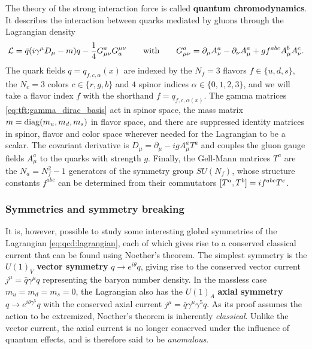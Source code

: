 The theory of the strong interaction force is called \textbf{quantum chromodynamics}.
It describes the interaction between quarks mediated by gluons through the Lagrangian density
\begin{equation}
	\mathcal{L} = \bar{q} ( i \gamma^\mu D_\mu - m ) q - \frac14 G_{\mu\nu}^a G^{\mu\nu}_a
	\qquad \text{with} \qquad
	G_{\mu\nu}^a = \partial_\mu A_\nu^a - \partial_\nu A_\mu^a + g f^{abc} A_\mu^b A_\nu^c.
\label{eq:qcd:lagrangian}
\end{equation}
The quark fields $q = q_{f,c,\alpha}(x)$ are indexed by
the $N_f = 3$ flavors $f \in \{u,d,s\}$,
the $N_c = 3$ colors $c \in \{r,g,b\}$ and
$4$ spinor indices $\alpha \in \{0,1,2,3\}$,
and we will take a flavor index $f$ with the shorthand $f = q_{f,c,\alpha(x)}$.
The gamma matrices \eqref{eq:tft:gamma_dirac_basis} act in spinor space,
the mass matrix $m = \operatorname{diag}(m_u, m_d, m_s)$ in flavor space,
and there are suppressed identity matrices in spinor, flavor and color space wherever needed for the Lagrangian to be a scalar.
The covariant derivative is $D_\mu = \partial_\mu - i g A_\mu^a T^a$ and couples the gluon gauge fields $A_\mu^a$ to the quarks with strength $g$.
Finally, the Gell-Mann matrices $T^a$ are the $N_a = N_f^2 - 1$ generators of the symmetry group $SU(N_f)$,
whose structure constants $f^{abc}$ can be determined from their commutators $[ T^a , T^b ] = i f^{abc} T^c$.


\subsubsection{Symmetries and symmetry breaking}

It is, however, possible to study some interesting global symmetries of the Lagrangian \eqref{eq:qcd:lagrangian}, each of which gives rise to a conserved classical current that can be found using Noether's theorem.
The simplest symmetry is the $U(1)_V$ \textbf{vector symmetry} $q \rightarrow e^{i \theta} q$, giving rise to the conserved vector current $j^\mu = \bar{q} \gamma^\mu q$ representing the baryon number density.
In the massless case $m_u = m_d = m_s = 0$, the Lagrangian also has the $U(1)_A$ \textbf{axial symmetry} $q \rightarrow e^{i \theta \gamma^5} q$ with the conserved axial current $j^\mu = \bar{q} \gamma^\mu \gamma^5 q$.
As its proof assumes the action to be extremized, Noether's theorem is inherently \emph{classical}.
Unlike the vector current, the axial current is no longer conserved under the influence of quantum effects, and is therefore said to be \emph{anomalous}.

